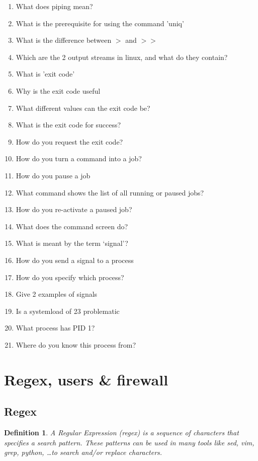 \documentclass{article}
\newtheorem{theorem}{Definition}[section]
\begin{document}
\begin{enumerate}
    \item What does piping mean?
    \item What is the prerequisite for using the command 'uniq'
    \item What is the difference between $>$ and $>>$
    \item Which are the 2 output streams in linux, and what do they contain?
    \item What is 'exit code'
    \item Why is the exit code useful
    \item What different values can the exit code be?
    \item What is the exit code for success?
    \item How do you request the exit code?
    \item How do you turn a command into a job?
    \item How do you pause a job
    \item What command shows the list of all running or paused jobs?
    \item How do you re-activate a paused job?
    \item What does the command screen do?
    \item What is meant by the term `signal'?
    \item How do you send a signal to a process
    \item How do you specify which process?
    \item Give 2 examples of signals
    \item Is a systemload of 23 problematic
    \item What process has PID 1?
    \item Where do you know this process from?
\end{enumerate}


\section{Regex, users \& firewall}

\subsection{Regex}

\begin{theorem}
    A Regular Expression (regex) is a sequence of characters that
    specifies a search pattern. These patterns can be used in 
    many tools like sed, vim, grep, python, \dots to search and/or replace characters.
\end{theorem}
\end{document}
